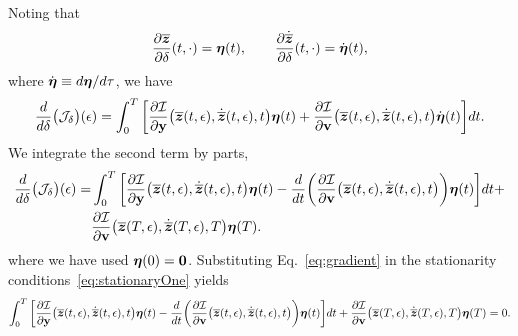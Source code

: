 \documentclass[3p,computermodern,10pt]{elsarticle}
\begin{document}
\begin{appendices}
Noting that
$$\frac{\partial \overline{\boldsymbol z}}{\partial \delta} (t,\cdot)= \boldsymbol \eta(t), \qquad \frac{\partial \dot{\overline{\boldsymbol z}} }{\partial \delta}(t,\cdot)= \dot{\boldsymbol \eta}(t),$$
where $\dot{\boldsymbol \eta} \equiv d \boldsymbol \eta / d\tau$, 
we have
$$
\frac{d}{d\delta} \big( \mathcal{J}_{\delta} \big)(\epsilon)
= \int_0^T \bigg[ \frac{\partial \mathcal{I}  }{\partial \mathbf{y} } \big(\overline{\boldsymbol z}(t,\epsilon),\dot{\overline{\boldsymbol z}}(t,\epsilon),t \big) \boldsymbol \eta(t)  + \frac{\partial \mathcal{I}}{\partial \mathbf{{v}} } \big(\overline{\boldsymbol z}(t,\epsilon),\dot{\overline{\boldsymbol z}}(t,\epsilon) ,t \big) \dot{\boldsymbol \eta}(t) \bigg]dt. $$
We integrate the second term by parts,
\begin{align}\label{eq:gradient}
	\begin{split}
\frac{d}{d\delta} \big( \mathcal{J}_{\delta} \big)(\epsilon)
	=&  \int_0^T  \bigg[\frac{\partial \mathcal{I}  }{\partial \mathbf{y} }
	\big(\overline{\boldsymbol z}(t,\epsilon),\dot{\overline{\boldsymbol z}}(t,\epsilon) , t \big)
	\boldsymbol \eta(t) - \frac{d}{dt}\bigg( \frac{\partial \mathcal{I}}{\partial
	\mathbf{{v}} }  \big(\overline{\boldsymbol z}(t,\epsilon),\dot{\overline{\boldsymbol z}}(t,\epsilon)
	,t \big) \bigg) \boldsymbol \eta(t) \bigg]dt + \\ &\frac{\partial \mathcal{I}}{\partial \mathbf{{v}}} \big(\overline{\boldsymbol z}(T,\epsilon),\dot{\overline{\boldsymbol z}}(T,\epsilon) ,T \big) \boldsymbol \eta(T) . 
	\end{split}
\end{align}
where we have used $\boldsymbol \eta(0) = \boldsymbol 0$.
Substituting Eq.~\eqref{eq:gradient} in the stationarity conditions~\eqref{eq:stationaryOne} yields
\begin{equation}\label{eq:statOne}
  \int_0^T  \bigg[\frac{\partial \mathcal{I}  }{\partial \mathbf{y} } \big(\overline{\boldsymbol z}(t,\epsilon),\dot{\overline{\boldsymbol z}}(t,\epsilon),t \big) \boldsymbol \eta(t) - \frac{d}{dt}\bigg( \frac{\partial \mathcal{I}}{\partial \mathbf{{v}} }  \big(\overline{\boldsymbol z}(t,\epsilon),\dot{\overline{\boldsymbol z}}(t,\epsilon),t \big) \bigg) \boldsymbol \eta(t) \bigg]dt + \frac{\partial \mathcal{I}}{\partial \mathbf{{v}}} \big(\overline{\boldsymbol z}(T,\epsilon),\dot{\overline{\boldsymbol z}}(T,\epsilon),T \big) \boldsymbol \eta(T)  = 0. 
\end{equation}

\end{appendices}
\end{document}
